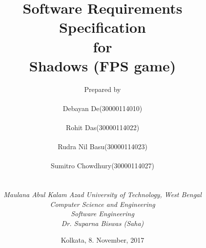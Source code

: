 \def\Company{FPS Gaming}
\def\Institute{\textit{Maulana Abul Kalam Azad University of Technology, West Bengal}}
\def\Course{\textit{Computer Science and Engineering}}
\def\Module{\textit{Software Engineering}}
\def\Docent{\textit{Dr. Suparna Biswas (Saha)}}
\def\Assistant{\textit{}}

\def\BoldTitle{Software Requirements Specification}

\def\Subtitle{for \\ Shadows (FPS game) \\}
\def\Authors{Prepared by \\\\ Debayan De(30000114010) \\\\ Rohit Das(30000114022) \\\\ Rudra Nil Basu(30000114023) \\\\ Sumitro Chowdhury(30000114027) } 
\def\Shortname{}


\title{\textbf{\BoldTitle}\\\Subtitle}
\author{\Authors \\ \\ \\ \Institute\\ \Course\\ \Module\\ \Docent\\}
\date{Kolkata, 8. November, 2017}

